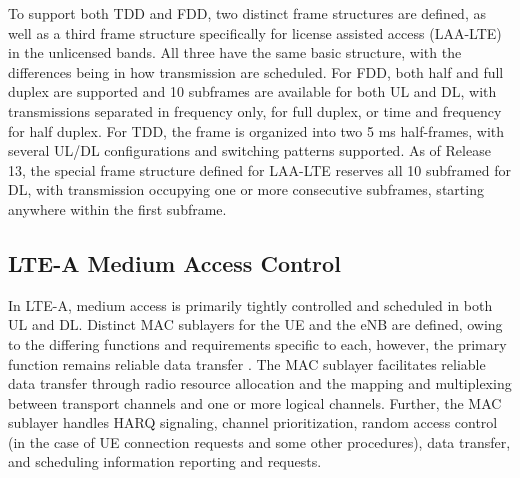 To support both TDD and FDD, two distinct frame structures are defined, as well as a third frame structure specifically for license assisted access (LAA-LTE) in the unlicensed bands.  All three have the same basic structure, with the differences being in how transmission are scheduled.  For FDD, both half and full duplex are supported and 10 subframes are available for both UL and DL, with transmissions separated in frequency only, for full duplex, or time and frequency for half duplex.  For TDD, the frame is organized into two 5 ms half-frames, with several UL/DL configurations and switching patterns supported.  As of Release 13, the special frame structure defined for LAA-LTE reserves all 10 subframed for DL, with transmission occupying one or more consecutive subframes, starting anywhere within the first subframe.


\subsection{LTE-A Medium Access Control}
\label{lte-mac}
In LTE-A, medium access is primarily tightly controlled and scheduled in both UL and DL.  Distinct MAC sublayers for the UE and the eNB are defined, owing to the differing functions and requirements specific to each, however, the primary function remains reliable data transfer \cite{tr36321}.  The MAC sublayer facilitates reliable data transfer through radio resource allocation and the mapping and multiplexing between transport channels and one or more logical channels.  Further, the MAC sublayer handles HARQ signaling, channel prioritization, random access control (in the case of UE connection requests and some other procedures), data transfer, and scheduling information reporting and requests.  




